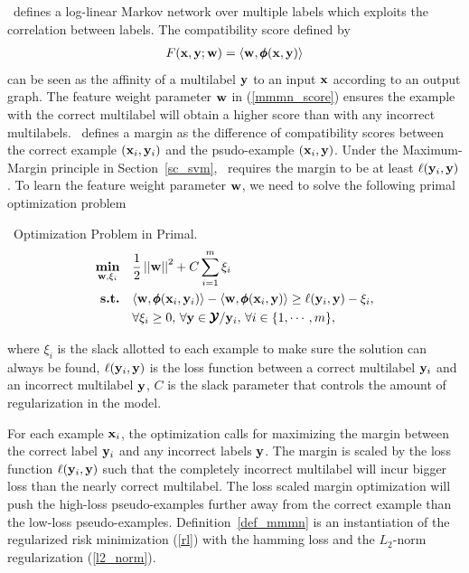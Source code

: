 {\mmmn\ defines a log-linear Markov network over multiple labels which exploits the correlation between labels.
The compatibility score defined by 
\begin{align}
	F(\mathbf {x},\mathbf {y};\mathbf {w}) = \langle \mathbf {w}, \pmb \phi(\mathbf {x},\mathbf {y}) \rangle \label{mmmn_score}
\end{align}
can be seen as the affinity of a multilabel $\mathbf {y}$ to an input $\mathbf {x}$ according to an output graph.
The feature weight parameter $\mathbf {w}$ in (\ref{mmmn_score}) ensures the example with the correct multilabel will obtain a higher score than with any incorrect multilabels.
\mmmn\ defines a margin as the difference of compatibility scores between the correct example $(\mathbf {x}_i,\mathbf {y}_i)$ and the psudo-example $(\mathbf {x}_i,\mathbf {y})$.
Under the Maximum-Margin principle in Section~\ref{sc_svm}, \mmmn\ requires the margin to be at least $\mathbf {\ell}(\mathbf {y}_i,{\mathbf {y}})$.
To learn the feature weight parameter $\mathbf {w}$, we need to solve the following primal optimization problem
\begin{definition}{\mmmn\ Optimization Problem in Primal.}\label{def_mmmn}
	\begin{align*}
		\underset{\mathbf {w},\mathbf{\xi}_i}{\textbf{min}} & \quad\frac{1}{2}\left|\left| \mathbf {w} \right|\right|^2 + C\sum_{i=1}^{m}\xi_i \\
		\textbf{s.t.} & \quad\langle \mathbf {w}, \pmb \phi(\mathbf {x}_i,\mathbf {y}_i) \rangle - \langle \mathbf {w}, \pmb \phi(\mathbf {x}_i,\mathbf {y}) \rangle \ge \mathbf {\ell}(\mathbf {y}_i,\mathbf {y})-\xi_i,\\
		& \quad \forall \xi_i\ge0,\, \forall \mathbf {y}\in\pmb {\mathcal{Y}}/\mathbf {y}_i,\, \forall i\in\{1,\cdots,m\},
	\end{align*}
\end{definition}
\noindent
where $\xi_i$ is the slack allotted to each example to make sure the solution can always be found, $\mathbf {\ell}(\mathbf {y}_i,\mathbf {y})$ is the loss function between a correct multilabel $\mathbf {y}_i$ and an incorrect multilabel $\mathbf {y}$, $C$ is the slack parameter that controls the amount of regularization in the model.

For each example $\mathbf {x}_i$, the optimization calls for maximizing the margin between the correct label $\mathbf {y}_i$ and any incorrect labels $\mathbf {y}$.
The margin is scaled by the loss function $\mathbf {\ell}(\mathbf {y}_i,{\mathbf {y}})$ such that the completely incorrect multilabel will incur bigger loss than the nearly correct multilabel.
The loss scaled margin optimization will push the high-loss pseudo-examples further away from the correct example than the low-loss pseudo-examples.
Definition~\ref{def_mmmn} is an instantiation of the regularized risk minimization (\ref{rl}) with the hamming loss and the $L_2$-norm regularization (\ref{l2_norm}).

}
